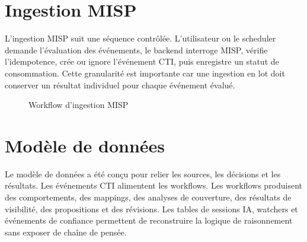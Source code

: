 \section{Ingestion MISP}

L'ingestion MISP suit une séquence contrôlée. L'utilisateur ou le scheduler demande l'évaluation des événements, le backend interroge MISP, vérifie l'idempotence, crée ou ignore l'événement CTI, puis enregistre un statut de consommation. Cette granularité est importante car une ingestion en lot doit conserver un résultat individuel pour chaque événement évalué.

\begin{figure}[H]
\centering
{}
\caption{Workflow d'ingestion MISP}
\label{fig:misp-ingestion}
\end{figure}

\section{Modèle de données}

Le modèle de données a été conçu pour relier les sources, les décisions et les résultats. Les événements CTI alimentent les workflows. Les workflows produisent des comportements, des mappings, des analyses de couverture, des résultats de visibilité, des propositions et des révisions. Les tables de sessions IA, watchers et événements de confiance permettent de reconstruire la logique de raisonnement sans exposer de chaîne de pensée.

